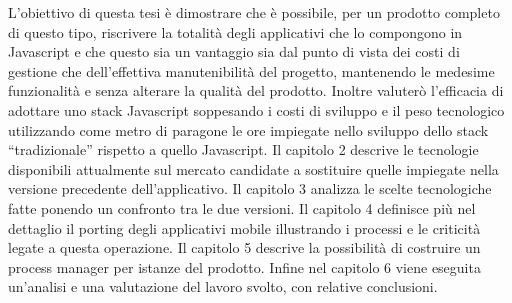 	L’obiettivo di questa tesi è dimostrare che è possibile, per un prodotto completo di questo tipo, riscrivere la totalità degli applicativi che lo compongono in Javascript e che questo sia un vantaggio sia dal punto di vista dei costi di gestione che dell’effettiva manutenibilità del progetto, mantenendo le medesime funzionalità e senza alterare la qualità del prodotto. Inoltre valuterò l’efficacia di adottare uno stack Javascript soppesando i costi di sviluppo e il peso tecnologico utilizzando come metro di paragone le ore impiegate nello sviluppo dello stack “tradizionale” rispetto a quello Javascript.
Il capitolo 2 descrive le tecnologie disponibili attualmente sul mercato candidate a sostituire quelle impiegate nella versione precedente dell’applicativo. Il capitolo 3 analizza le scelte tecnologiche fatte ponendo un confronto tra le due versioni. Il capitolo 4 definisce più nel dettaglio il porting degli applicativi mobile illustrando i processi e le criticità legate a questa operazione. Il capitolo 5 descrive la possibilità di costruire un process manager per istanze del prodotto. Infine nel capitolo 6 viene eseguita un’analisi e una valutazione del lavoro svolto, con relative conclusioni. 








